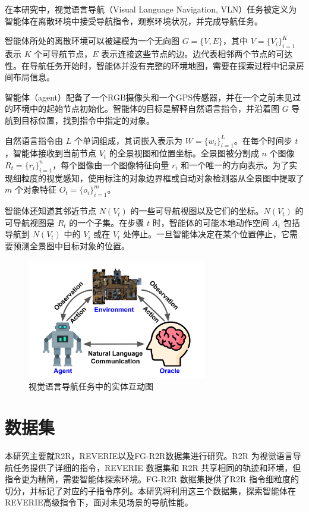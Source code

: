 \documentclass[bachelor]{thesis-uestc}
\begin{document}
在本研究中，视觉语言导航（Visual Language Navigation, VLN）任务被定义为智能体在离散环境中接受导航指令，观察环境状况，并完成导航任务。

智能体所处的离散环境可以被建模为一个无向图 \( G = \{V, E\} \)，其中 \( V = \{V_i\}_{i=1}^{K} \) 表示 \( K \) 个可导航节点，\( E \) 表示连接这些节点的边。边代表相邻两个节点的可达性。在导航任务开始时，智能体并没有完整的环境地图，需要在探索过程中记录房间布局信息。

智能体（agent）配备了一个RGB摄像头和一个GPS传感器，并在一个之前未见过的环境中的起始节点初始化。智能体的目标是解释自然语言指令，并沿着图 \( G \) 导航到目标位置，找到指令中指定的对象。

自然语言指令由 \( L \) 个单词组成，其词嵌入表示为 \( W = \{w_i\}_{i=1}^{L} \)。在每个时间步 \( t \)，智能体接收到当前节点 \( V_t \) 的全景视图和位置坐标。全景图被分割成 \( n \) 个图像 \( R_t = \{r_i\}_{i=1}^{n} \)，每个图像由一个图像特征向量 \( r_i \) 和一个唯一的方向表示。为了实现细粒度的视觉感知，使用标注的对象边界框或自动对象检测器从全景图中提取了 \( m \) 个对象特征 \( O_t = \{o_i\}_{i=1}^{m} \)。

智能体还知道其邻近节点 \( N(V_t) \) 的一些可导航视图以及它们的坐标。\( N(V_t) \) 的可导航视图是 \( R_t \) 的一个子集。在步骤 \( t \) 时，智能体的可能本地动作空间 \( A_t \) 包括导航到 \( N(V_t) \) 中的 \( V_i \) 或在 \( V_t \) 处停止。一旦智能体决定在某个位置停止，它需要预测全景图中目标对象的位置。
\begin {figure}[h]
\centering %
\includegraphics[width=0.7\textwidth]{5253-050520.png}
\caption{视觉语言导航任务中的实体互动图} %
\label{orace}
\end {figure}
\section{数据集}

本研究主要就R2R，REVERIE以及FG-R2R数据集进行研究。R2R 为视觉语言导航任务提供了详细的指令，REVERIE 数据集和 R2R 共享相同的轨迹和环境，但指令更为精简，需要智能体探索环境。FG-R2R 数据集提供了R2R 指令细粒度的切分，并标记了对应的子指令序列。本研究将利用这三个数据集，探索智能体在REVERIE高级指令下，面对未见场景的导航性能。
\end{document}
